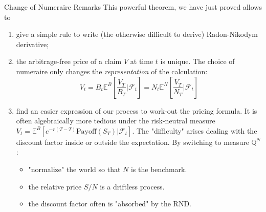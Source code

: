 \documentclass{beamer}
\begin{document}
\begin{frame}{Change of Numeraire Remarks}
	This powerful theorem, we have just proved allows to
	\begin{enumerate}
		\item give a simple rule to write (the otherwise difficult to derive) Radon-Nikodym derivative;
		\item the arbitrage-free price of a claim $V$ at time $t$ is unique. The choice of numeraire only changes the \textit{representation} of the calculation:
		\begin{equation*}
			V_t = B_t \mathbb{E}^{B} \left[ \frac{V_T}{B_T} \bigg| \mathcal{F}_t \right] = N_t \mathbb{E}^{N} \left[ \frac{V_T}{N_T} \bigg| \mathcal{F}_t \right]
		\end{equation*}
		\item find an easier expression of our process to work-out the pricing formula. It is often algebraically more tedious under the risk-neutral measure $V_t=\mathbb{E}^{B}[e^{-r(T-T)}\text{Payoff}(S_T)|\mathcal{F}_t]$.
		The "difficulty" arises dealing with the discount factor inside or outside the expectation.
		By switching to measure $\mathbb{Q}^N$:
		\begin{itemize}
			\item "normalize" the world so that $N$ is the benchmark.
			\item the relative price $S/N$ is a \textcolor{maincolor}{driftless process}.
			\item the discount factor often is "absorbed" by the RND.
		\end{itemize}
	\end{enumerate}
\end{frame}
\end{document}
